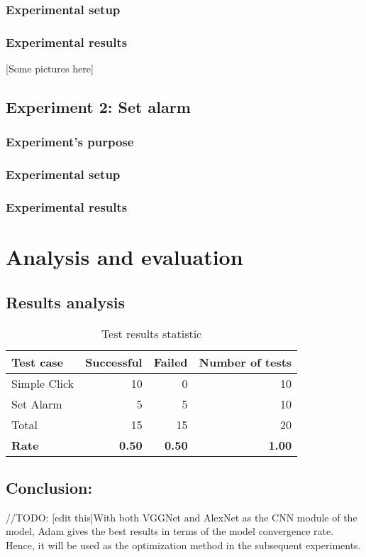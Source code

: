 \subsubsection{Experimental setup}

\subsubsection{Experimental results}
[Some pictures here]

\subsection{Experiment 2: Set alarm}
\subsubsection{Experiment's purpose}

\subsubsection{Experimental setup}

\subsubsection{Experimental results}

\section{Analysis and evaluation}
\subsection{Results analysis}
\begin{table}[H]
	\centering
	\caption{Test results statistic}	
	\label{tab:result_stat}
	\begin{tabularx}{0.65\textwidth}{l|rrr}
		\hline
		Test case & Successful & Failed & Number of tests \\
		\hline
		Simple Click & 10 & 0 & 10 \\
		Set Alarm & 5 & 5 & 10 \\
		\hline
		Total & 15 & 15 & 20 \\
		\hline
		\textbf{Rate} & \textbf{0.50} & \textbf{0.50} & \textbf{1.00} \\
		\hline
	\end{tabularx}
\end{table}

\subsection{Conclusion:} //TODO: [edit this]With both VGGNet and AlexNet as the CNN module of the model, Adam gives the best results in terms of the model convergence rate. Hence, it will be used as the optimization method in the subsequent experiments.
